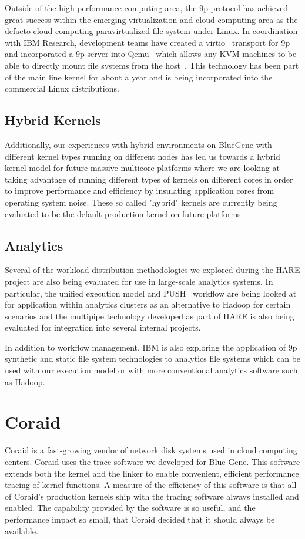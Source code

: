 Outside of the high performance computing area, the 9p protocol has achieved great success
within the emerging virtualization and cloud computing area as the defacto cloud computing
paravirtualized file system under Linux.  In coordination with IBM Research, development
teams have created a virtio~\cite{virtio} transport for 9p and incorporated a 9p server into
Qemu~\cite{qemu} which allows any KVM machines to be able to directly mount file systems
from the host~\cite{virtfs}.  This technology has been part of the main line kernel for about
a year and is being incorporated into the commercial Linux distributions.

\subsection{Hybrid Kernels}

Additionally, our experiences with hybrid environments on BlueGene with different kernel
types running on different nodes has led us towards a hybrid kernel model for future
massive multicore platforms where we are looking at taking advantage of running different
types of kernels on different cores in order to improve performance and efficiency by
insulating application cores from operating system noise.  These so called "hybrid" kernels
are currently being evaluated to be the default production kernel on future platforms.

\subsection{Analytics}

Several of the workload distribution methodologies we explored 
during the HARE project are also being evaluated for use in large-scale
analytics systems.  In particular, the unified execution model and PUSH~\cite{PUSH}
workflow are being looked at for application within analytics clusters as an alternative to
Hadoop for certain scenarios and the multipipe technology developed as part of HARE is
also being evaluated for integration into several internal projects.

In addition to workflow management, IBM is also exploring the application of
9p synthetic and static file system technologies to analytics file systems which
can be used with our execution model or with more conventional analytics software
such as Hadoop. 

\section{Coraid}
Coraid is a fast-growing vendor of network disk systems used in cloud computing centers. 
Coraid uses the trace software we developed\cite{plan9trace} for Blue Gene. 
This software extends both the kernel and the linker to enable convenient, efficient 
performance tracing of kernel functions. A measure of the efficiency of this software 
is that  all of Coraid's production
kernels ship with the tracing software always installed and enabled. 
The capability provided by the software is so useful, and the performance impact so small, 
that Coraid decided that it should always be available. 

